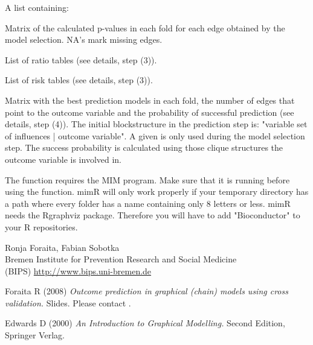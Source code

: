 \begin{Value}
A list containing:
\begin{ldescription}
\item[\code{ pvalue }] Matrix of the calculated p-values in each fold for each edge obtained by the model selection. 
NA's mark missing edges. 
\item[\code{ ratio }] List of ratio tables (see details, step (3)). 
\item[\code{ risk }] List of risk tables (see details, step (3)). 
\item[\code{ success }] Matrix with the best prediction models in each fold, the number of edges that point
to the outcome variable and the probability of successful prediction (see details, step (4)). 
The initial blockstructure in the prediction step is: "variable set of influences | outcome variable".   
A given  is only used during the model selection step.                   
The success probability is calculated using those clique structures the outcome variable is involved in.

\end{ldescription}
\end{Value}
\begin{Note}\relax
The function requires the MIM program.
Make sure that it is running before using the function.
mimR will only work properly if your temporary directory has a path
where every folder has a name containing only 8 letters or less. mimR needs the Rgraphviz package.
Therefore you will have to add "Bioconductor" to your R repositories.
\end{Note}
\begin{Author}\relax
Ronja Foraita, Fabian Sobotka \\
Bremen Institute for Prevention Research and Social Medicine \\
(BIPS)  \url{http://www.bips.uni-bremen.de}
\end{Author}
\begin{References}\relax
Foraita R (2008) 
\emph{Outcome prediction in graphical (chain) models using cross validation.}
Slides. Please contact .

Edwards D (2000) 
\emph{An Introduction to Graphical Modelling.}
Second Edition, Springer Verlag.
\end{References}
\begin{SeeAlso}\relax
{}
\end{SeeAlso}
